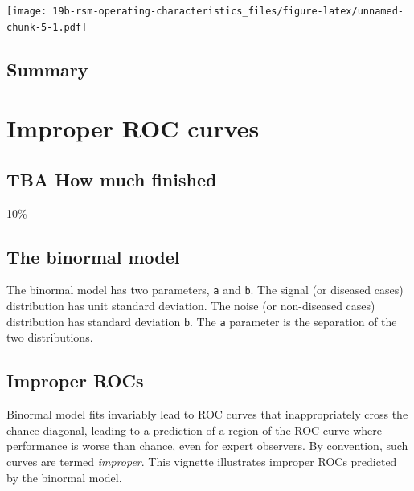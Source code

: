 \documentclass[
]{book}
\begin{document}
\texttt{[image: 19b-rsm-operating-characteristics\_files/figure-latex/unnamed-chunk-5-1.pdf]}

\hypertarget{summary-2}{%
\section{Summary}\label{summary-2}}

\hypertarget{improper-rocs}{%
\chapter{Improper ROC curves}\label{improper-rocs}}

\hypertarget{improper-rocs-how-much-finished}{%
\section{TBA How much finished}\label{improper-rocs-how-much-finished}}

10\%

\hypertarget{the-binormal-model}{%
\section{The binormal model}\label{the-binormal-model}}

The binormal model has two parameters, \texttt{a} and \texttt{b}. The signal (or diseased cases) distribution has unit standard deviation.
The noise (or non-diseased cases) distribution has standard deviation \texttt{b}. The \texttt{a} parameter is the separation of the two distributions.

\hypertarget{improper-rocs-1}{%
\section{Improper ROCs}\label{improper-rocs-1}}

Binormal model fits invariably lead to ROC curves that inappropriately cross the chance diagonal, leading to a prediction of a region of the ROC curve where performance is worse than chance, even for expert observers. By convention, such curves are termed \emph{improper}. This vignette illustrates improper ROCs predicted by the binormal model.
\end{document}
